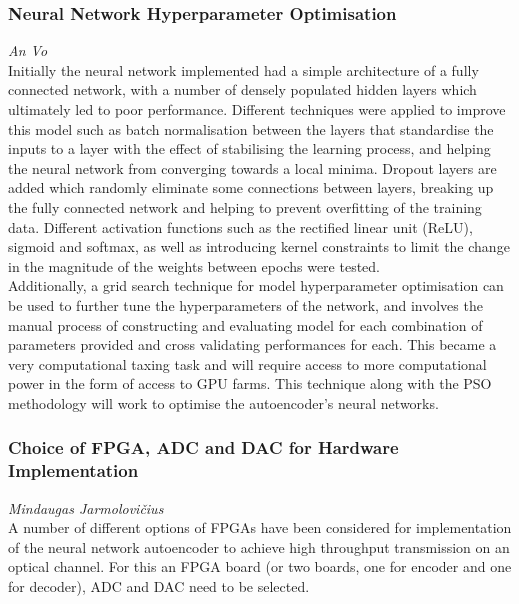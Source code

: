     \subsubsection{Neural Network Hyperparameter Optimisation}
    \hspace*{0pt}\hfill \textit{An Vo}\\
    \label{sec:neural_network_hyperparameter_optimisation}
        Initially the neural network implemented had a simple architecture of a fully connected network, with a number of densely populated hidden layers which ultimately led to poor performance. Different techniques were applied to improve this model such as batch normalisation between the layers that standardise the inputs to a layer with the effect of stabilising the learning process, and helping the neural network from converging towards a local minima. Dropout layers are added which randomly eliminate some connections between layers, breaking up the fully connected network and helping to prevent overfitting of the training data. Different activation functions such as the rectified linear unit (ReLU), sigmoid and softmax, as well as introducing kernel constraints to limit the change in the magnitude of the weights between epochs were tested.
        \\
        
        Additionally, a grid search technique for model hyperparameter optimisation can be used to further tune the hyperparameters of the network, and involves the manual process of constructing and evaluating model for each combination of parameters provided and cross validating performances for each. This became a very computational taxing task and will require access to more computational power in the form of access to GPU farms. This technique along with the PSO methodology will work to optimise the autoencoder's neural networks.

    \subsubsection{Choice of FPGA, ADC and DAC for Hardware Implementation}
    \label{sec:fpga_choice}
    \hspace*{0pt}\hfill \textit{Mindaugas Jarmolovi\v{c}ius}\\
    
    A number of different options of FPGAs have been considered for implementation of the neural network autoencoder to achieve high throughput transmission on an optical channel. For this an FPGA board (or two boards, one for encoder and one for decoder), ADC and DAC need to be selected.
    \\
    
